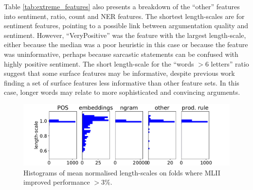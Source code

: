 Table \ref{tab:extreme_features} also presents a breakdown of the ``other'' features into sentiment, ratio, count and NER features. 
The shortest length-scales are for sentiment features, pointing to a possible link between 
argumentation quality and sentiment. However, ``VeryPositive'' was the feature with
the largest length-scale, either because the median was a poor heuristic in this case or
because the feature was uninformative, perhaps because sarcastic statements can be confused with highly positive sentiment.
The short length-scale for the ``words $>6$ letters'' ratio suggest that some surface features may be informative,
despite previous work \cite{wei2016post} finding a set of surface features less informative than other feature sets. 
In this case, longer words may relate to more sophisticated and convincing arguments. 
\begin{figure}[h]
\includegraphics[width=\columnwidth, clip=True, trim=32 0 57 0]{figures/features2/boxplot}
\caption{Histograms of mean normalised length-scales on folds where MLII improved performance $>3\%$.}
\label{fig:boxplot}
\end{figure}
